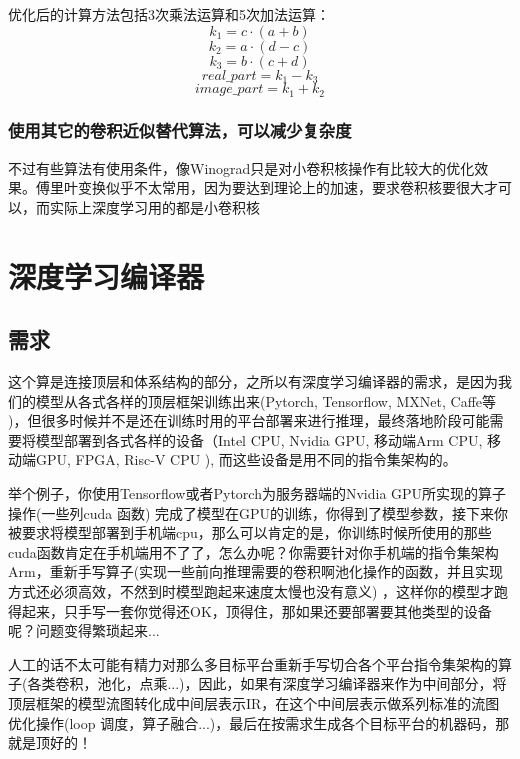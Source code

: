 \documentclass[12pt]{article}
\begin{document}
优化后的计算方法包括3次乘法运算和5次加法运算：
$$
k_1 = c \cdot (a + b)
$$
$$
k_2 = a \cdot (d - c)
$$
$$
k_3 = b \cdot (c + d)
$$
$$
real\_part = k_1 - k_3
$$
$$
image\_part = k_1 + k_2
$$

\subsubsection{使用其它的卷积近似替代算法，可以减少复杂度}
不过有些算法有使用条件，像Winograd只是对小卷积核操作有比较大的优化效果。傅里叶变换似乎不太常用，因为要达到理论上的加速，要求卷积核要很大才可以，而实际上深度学习用的都是小卷积核

\section{深度学习编译器}
\subsection{需求}
这个算是连接顶层和体系结构的部分，之所以有深度学习编译器的需求，是因为我们的模型从各式各样的顶层框架训练出来(Pytorch, Tensorflow, MXNet, Caffe等 )，但很多时候并不是还在训练时用的平台部署来进行推理，最终落地阶段可能需要将模型部署到各式各样的设备（Intel CPU, Nvidia GPU, 移动端Arm CPU, 移动端GPU, FPGA, Risc-V CPU ), 而这些设备是用不同的指令集架构的。

举个例子，你使用Tensorflow或者Pytorch为服务器端的Nvidia GPU所实现的算子操作(一些列cuda 函数) 完成了模型在GPU的训练，你得到了模型参数，接下来你被要求将模型部署到手机端cpu，那么可以肯定的是，你训练时候所使用的那些cuda函数肯定在手机端用不了了，怎么办呢？你需要针对你手机端的指令集架构Arm，重新手写算子(实现一些前向推理需要的卷积啊池化操作的函数，并且实现方式还必须高效，不然到时模型跑起来速度太慢也没有意义) ，这样你的模型才跑得起来，只手写一套你觉得还OK，顶得住，那如果还要部署要其他类型的设备呢？问题变得繁琐起来...

人工的话不太可能有精力对那么多目标平台重新手写切合各个平台指令集架构的算子(各类卷积，池化，点乘...)，因此，如果有深度学习编译器来作为中间部分，将顶层框架的模型流图转化成中间层表示IR，在这个中间层表示做系列标准的流图优化操作(loop 调度，算子融合...)，最后在按需求生成各个目标平台的机器码，那就是顶好的！
\end{document}
